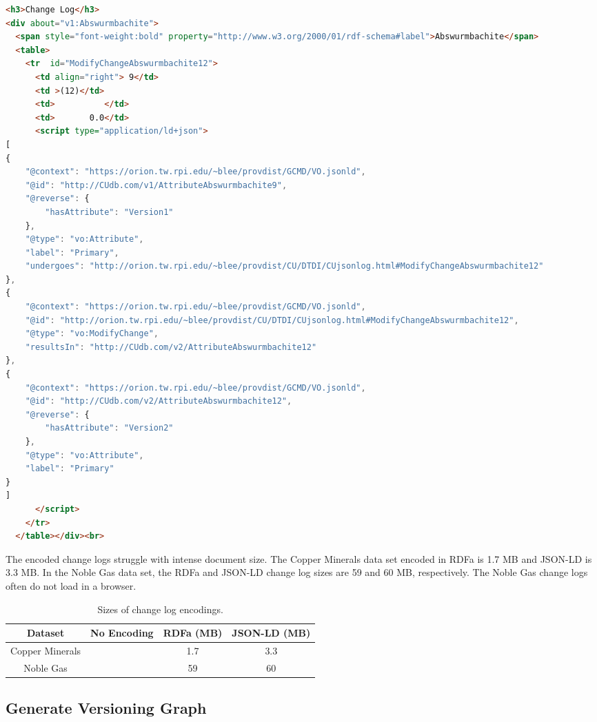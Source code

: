 \begin{lstlisting}[language=HTML, caption=Abswurmbachite JSON-LD, label=json_list]
<h3>Change Log</h3>
<div about="v1:Abswurmbachite">
  <span style="font-weight:bold" property="http://www.w3.org/2000/01/rdf-schema#label">Abswurmbachite</span>
  <table>
    <tr  id="ModifyChangeAbswurmbachite12">
      <td align="right"> 9</td>
      <td >(12)</td>
      <td>          </td>
      <td>       0.0</td>
      <script type="application/ld+json">
[
{
	"@context": "https://orion.tw.rpi.edu/~blee/provdist/GCMD/VO.jsonld", 
	"@id": "http://CUdb.com/v1/AttributeAbswurmbachite9", 
	"@reverse": {
		"hasAttribute": "Version1"
	}, 
	"@type": "vo:Attribute", 
	"label": "Primary", 
	"undergoes": "http://orion.tw.rpi.edu/~blee/provdist/CU/DTDI/CUjsonlog.html#ModifyChangeAbswurmbachite12"
}, 
{
	"@context": "https://orion.tw.rpi.edu/~blee/provdist/GCMD/VO.jsonld", 
	"@id": "http://orion.tw.rpi.edu/~blee/provdist/CU/DTDI/CUjsonlog.html#ModifyChangeAbswurmbachite12", 
	"@type": "vo:ModifyChange", 
	"resultsIn": "http://CUdb.com/v2/AttributeAbswurmbachite12"
}, 
{
	"@context": "https://orion.tw.rpi.edu/~blee/provdist/GCMD/VO.jsonld", 
	"@id": "http://CUdb.com/v2/AttributeAbswurmbachite12", 
	"@reverse": {
		"hasAttribute": "Version2"
	}, 
	"@type": "vo:Attribute", 
	"label": "Primary"
}
]
      </script>
    </tr>
  </table></div><br>
\end{lstlisting}

The encoded change logs struggle with intense document size.
The Copper Minerals data set encoded in RDFa is 1.7 MB and JSON-LD is 3.3 MB.
In the Noble Gas data set, the RDFa and JSON-LD change log sizes are 59 and 60 MB, respectively.
The Noble Gas change logs often do not load in a browser.

\begin{table}[b]
	\caption{Sizes of change log encodings.}
	\label{changelog_table}
	\centering
	\begin{tabular}{|c|c|c|c|}
		\hline
		Dataset & No Encoding & RDFa (MB) & JSON-LD (MB) \\
		\hline
		Copper Minerals &  & 1.7 & 3.3 \\
		Noble Gas &  & 59 & 60 \\
		\hline
	\end{tabular}
\end{table}

\subsection{Generate Versioning Graph}

